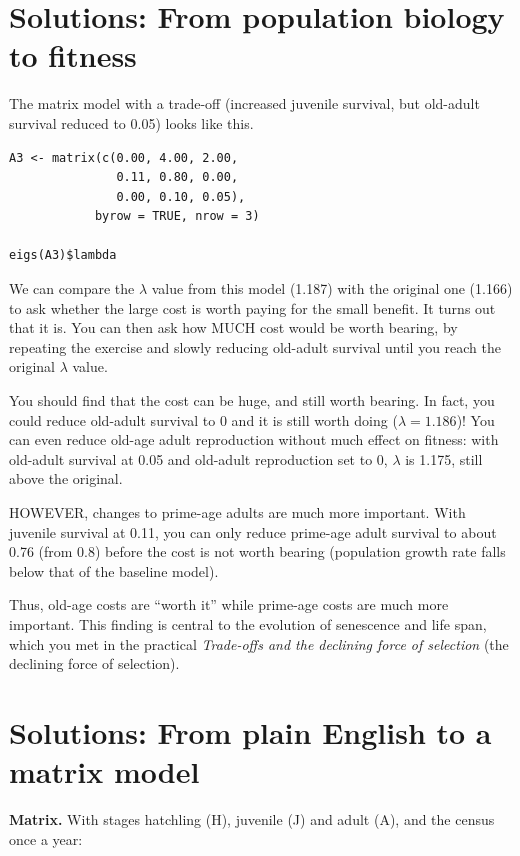 \documentclass[
  a4paper]{book}
\begin{document}
\section{Solutions: From population biology to fitness}\label{solutions-from-population-biology-to-fitness}

The matrix model with a trade-off (increased juvenile survival, but old-adult survival reduced to 0.05) looks like this.

\begin{verbatim}
A3 <- matrix(c(0.00, 4.00, 2.00,
               0.11, 0.80, 0.00,
               0.00, 0.10, 0.05),
            byrow = TRUE, nrow = 3)

eigs(A3)$lambda
\end{verbatim}

We can compare the \(\lambda\) value from this model (1.187) with the original one (1.166) to ask whether the large cost is worth paying for the small benefit. It turns out that it is. You can then ask how MUCH cost would be worth bearing, by repeating the exercise and slowly reducing old-adult survival until you reach the original \(\lambda\) value.

You should find that the cost can be huge, and still worth bearing. In fact, you could reduce old-adult survival to 0 and it is still worth doing (\(\lambda = 1.186\))! You can even reduce old-age adult reproduction without much effect on fitness: with old-adult survival at 0.05 and old-adult reproduction set to 0, \(\lambda\) is 1.175, still above the original.

HOWEVER, changes to prime-age adults are much more important. With juvenile survival at 0.11, you can only reduce prime-age adult survival to about 0.76 (from 0.8) before the cost is not worth bearing (population growth rate falls below that of the baseline model).

Thus, old-age costs are ``worth it'' while prime-age costs are much more important. This finding is central to the evolution of senescence and life span, which you met in the practical \emph{Trade-offs and the declining force of selection} (the declining force of selection).

\section{Solutions: From plain English to a matrix model}\label{solutions-from-plain-english-to-a-matrix-model}

\textbf{Matrix.} With stages hatchling (H), juvenile (J) and adult (A), and the census once a year:
\end{document}
